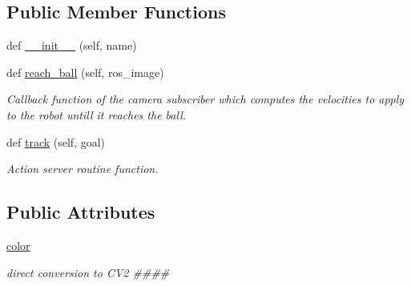 \subsection*{Public Member Functions}
\begin{DoxyCompactItemize}
\item 
def \hyperlink{classtrack_1_1TrackAction_ad71d2ce7ecd91c384219ada7e8ed74e3}{\+\_\+\+\_\+init\+\_\+\+\_\+} (self, name)
\item 
def \hyperlink{classtrack_1_1TrackAction_a3b41ed0eb7a403459469c27dd63a2392}{reach\+\_\+ball} (self, ros\+\_\+image)
\begin{DoxyCompactList}\small\item\em Callback function of the camera subscriber which computes the velocities to apply to the robot untill it reaches the ball. \end{DoxyCompactList}\item 
def \hyperlink{classtrack_1_1TrackAction_a1d41a25e35227ab25323a95eeb9a4bb2}{track} (self, goal)
\begin{DoxyCompactList}\small\item\em Action server routine function. \end{DoxyCompactList}\end{DoxyCompactItemize}
\subsection*{Public Attributes}
\begin{DoxyCompactItemize}
\item 
\hyperlink{classtrack_1_1TrackAction_abba894c7d22403050003dc50f5d79bba}{color}
\begin{DoxyCompactList}\small\item\em direct conversion to C\+V2 \#\#\#\# \end{DoxyCompactList}\end{DoxyCompactItemize}
